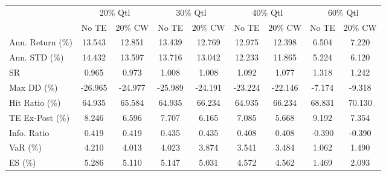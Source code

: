 \begin{tabular}{lcccccccc}
\toprule
{} & \multicolumn{2}{c}{20\% Qtl} & \multicolumn{2}{c}{30\% Qtl} & \multicolumn{2}{c}{40\% Qtl} & \multicolumn{2}{c}{60\% Qtl} \\
{} &   No TE &  20\% CW &   No TE &  20\% CW &   No TE &  20\% CW &   No TE &  20\% CW \\
\midrule
Ann. Return (\%) &  13.543 &  12.851 &  13.439 &  12.769 &  12.975 &  12.398 &   6.504 &   7.220 \\
Ann. STD (\%)    &  14.432 &  13.597 &  13.716 &  13.042 &  12.233 &  11.865 &   5.224 &   6.120 \\
SR              &   0.965 &   0.973 &   1.008 &   1.008 &   1.092 &   1.077 &   1.318 &   1.242 \\
Max DD (\%)      & -26.965 & -24.977 & -25.989 & -24.191 & -23.224 & -22.146 &  -7.174 &  -9.318 \\
Hit Ratio (\%)   &  64.935 &  65.584 &  64.935 &  66.234 &  64.935 &  66.234 &  68.831 &  70.130 \\
TE Ex-Post (\%)  &   8.246 &   6.596 &   7.707 &   6.165 &   7.085 &   5.668 &   9.192 &   7.354 \\
Info. Ratio     &   0.419 &   0.419 &   0.435 &   0.435 &   0.408 &   0.408 &  -0.390 &  -0.390 \\
VaR (\%)         &   4.210 &   4.013 &   4.023 &   3.874 &   3.541 &   3.484 &   1.062 &   1.490 \\
ES (\%)          &   5.286 &   5.110 &   5.147 &   5.031 &   4.572 &   4.562 &   1.469 &   2.093 \\
\bottomrule
\end{tabular}
